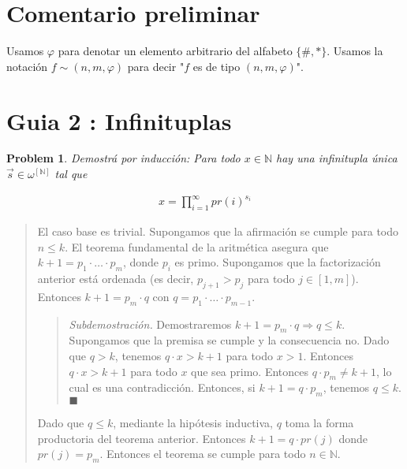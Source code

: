 \documentclass[a4paper, 12pt]{article}
\newtheorem{problem}{Problem}
\newtheorem{problem}{Problem}
\begin{document}
\section{Comentario preliminar}

Usamos $\varphi$ para denotar un elemento arbitrario del alfabeto $\{\#, *\}$. Usamos la notación $f \sim (n, m, \varphi)$ para decir "$f$ es de
tipo $(n, m, \varphi)$".

\section{Guia 2 : Infinituplas}


\begin{problem}
    Demostrá por inducción: 
    Para todo $x \in \mathbb{N}$ hay una infinitupla única $\overrightarrow{s}
    \in \omega^{[\mathbb{N}]}$ tal que

    \begin{align*}
        x = \prod_{i=1}^{\infty} pr(i)^{s_i}
    \end{align*}
\end{problem}

\small
\begin{quote}




El caso base es trivial. Supongamos que la afirmación se cumple para todo $n \leq k$. El
teorema fundamental de la aritmética asegura que $k + 1 = p_1 \cdot \ldots \cdot
p_m$, donde $p_i$ es primo. Supongamos que la factorización anterior está ordenada (es decir,
$p_{j + 1} > p_j$ para todo $j \in [1, m]$). Entonces $k + 1 = p_m \cdot q$ con $q =
p_1 \cdot \ldots \cdot p_{m - 1}$.

\footnotesize
\begin{quote}
\textit{Subdemostración.} Demostraremos $k + 1 = p_m \cdot q \Rightarrow q \leq k$.
Supongamos que la premisa se cumple y la consecuencia no. Dado que $q > k$, tenemos
$q \cdot x > k + 1$ para todo $x > 1$. Entonces $q \cdot x > k + 1$ para todo $x$
que sea primo. Entonces $q \cdot p_m \neq k + 1$, lo cual es una contradicción. Entonces,
si $k + 1 = q \cdot p_m$, tenemos $q \leq k$. $\blacksquare$
\end{quote}
\small

Dado que $q \leq k$, mediante la hipótesis inductiva, $q$ toma la forma productoria
del teorema anterior. Entonces $k + 1 = q \cdot pr(j)$ donde $pr(j) = p_m$. Entonces el
teorema se cumple para todo $n \in \mathbb{N}$.

\end{quote}
\normalsize
\end{document}
